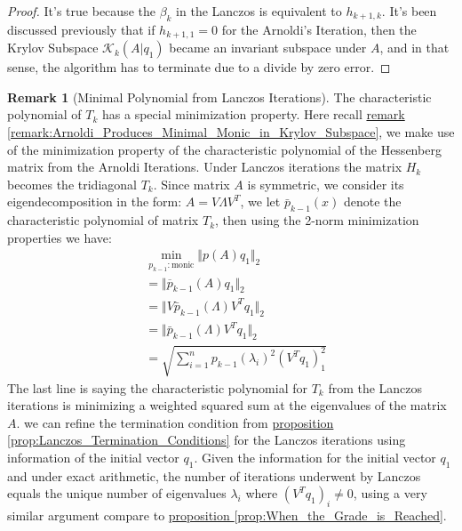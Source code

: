 \documentclass[]{article}
\theoremstyle{definition}
\newtheorem{remark}{Remark}[subsection]  %
\begin{document}
            \begin{proof}
                It's true because the $\beta_{k}$ in the Lanczos is equivalent to $h_{k + 1, k}$. It's been discussed previously that if $h_{k + 1, 1} = 0$ for the Arnoldi's Iteration, then the Krylov Subspace $\mathcal K_k(A|q_1)$ became an invariant subspace under $A$, and in that sense, the algorithm has to terminate due to a divide by zero error. 
            \end{proof}
            \begin{remark}[Minimal Polynomial from Lanczos Iterations]\label{remark:Minimal_Polynomial_from_Lanczos_Iterations}
                The characteristic polynomial of $T_k$ has a special minimization property. Here recall \hyperref[remark:Arnoldi_Produces_Minimal_Monic_in_Krylov_Subspace]{remark \ref*{remark:Arnoldi_Produces_Minimal_Monic_in_Krylov_Subspace}}, we make use of the minimization property of the characteristic polynomial of the Hessenberg matrix from the Arnoldi Iterations. Under Lanczos iterations the matrix $H_k$ becomes the tridiagonal $T_k$. Since matrix $A$ is symmetric, we consider its eigendecomposition in the form: $A = V\Lambda V^T$, we let $\bar{p}_{k - 1}(x)$ denote the characteristic polynomial of matrix $T_k$, then using the 2-norm minimization properties we have: 
                \begin{align}
                    & \min_{p_{k - 1}:\text{monic}} \Vert p(A)q_1\Vert_2
                    \\
                    & =\Vert \overline{p}_{k - 1}(A)q_1\Vert_2
                    \\
                    & = \Vert V \bar{p}_{k - 1}(\Lambda)V^Tq_1\Vert_2
                    \\
                    & = \Vert \bar{p}_{k - 1}(\Lambda)V^Tq_1\Vert_2
                    \\
                    &= \sqrt{
                        \sum_{i = 1}^n p_{k - 1}(\lambda_i)^2(V^Tq_1)^2_1
                    }
                \end{align}
                The last line is saying the characteristic polynomial for $T_k$ from the Lanczos iterations is minimizing a weighted squared sum at the eigenvalues of the matrix $A$. we can refine the termination condition from \hyperref[prop:Lanczos_Termination_Conditions]{proposition \ref*{prop:Lanczos_Termination_Conditions}} for the Lanczos iterations using information of the initial vector $q_1$. Given the information for the initial vector $q_1$ and under exact arithmetic, the number of iterations underwent by Lanczos equals the unique number of eigenvalues $\lambda_i$ where $(V^Tq_1)_i \neq 0$, using a very similar argument compare to \hyperref[prop:When_the_Grade_is_Reached]{proposition \ref*{prop:When_the_Grade_is_Reached}}. 

\end{remark}
\end{document}

